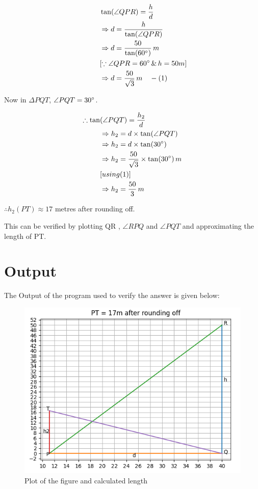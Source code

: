 \documentclass[twocoloumn]{article}
\begin{document}
\begin{multicols}{2}
\begin{align*}
\hspace{30pt}&\tan(\angle QPR) = \frac{h}{d} \\
&\Rightarrow d = \frac{h}{\tan(\angle QPR)} \\
&\Rightarrow d = \frac{50}{\tan(60\degree)}\, m \\
&[\because \angle QPR = 60\degree \, \& \, h = 50m] \\
&\Rightarrow d = \frac{50}{\sqrt{3}}\, m \hspace{10pt}-(1)
\end{align*}

Now in $\Delta PQT$, $\angle PQT = 30\degree$.

\begin{align*}
\therefore \tan&(\angle PQT) = \frac{h_2}{d} \\
&\Rightarrow h_2 = d \times \tan(\angle PQT)\\
&\Rightarrow h_2 = d \times \tan(30 \degree)\\
&\Rightarrow h_2 = \frac{50}{\sqrt{3}} \times \tan(30 \degree) \, m \\
&[using (1)]\\
&\Rightarrow h_2 = \frac{50}{3}\, m
\end{align*}

\noindent $\therefore h_2(PT)   \approx 17 $ metres after rounding off.

\vspace{2pt}
\noindent This can be verified by plotting QR , $\angle RPQ$ and $\angle PQT$ and approximating 
\noindent the length of PT.

\end{multicols}

\section*{Output}
\noindent The Output of the program used to verify the answer is given below:

\begin{figure}[h]
\includegraphics[width=\textwidth]{output.png}
\caption{Plot of the figure and calculated length}

\end{figure}
\end{document}
